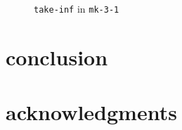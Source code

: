 \documentclass[format=acmlarge, review=true, authordraft=true]{acmart}
\begin{document}
\begin{figure}
	 	
	 \caption{\texttt{take-inf} in \texttt{mk-3-1}}
	 \label{take-inf-3-1}
\end{figure}



\section{conclusion}


\section*{acknowledgments}



\end{document}

